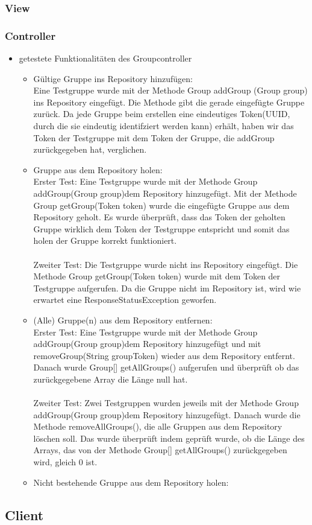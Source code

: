 \documentclass[a4paper]{scrreprt}
\begin{document}
\subsubsection{View}


\subsubsection{Controller}
\begin{itemize}
	\item \b getestete Funktionalitäten des Groupcontroller
	\begin{itemize}
		\item {Gültige Gruppe ins Repository hinzufügen: \\
		Eine Testgruppe wurde mit der Methode Group addGroup (Group group) ins Repository eingefügt. Die Methode gibt die gerade eingefügte Gruppe zurück.
Da jede Gruppe beim erstellen eine eindeutiges Token(UUID, durch die sie eindeutig identifziert werden kann) erhält, haben wir das Token der Testgruppe mit dem Token der Gruppe, die addGroup zurückgegeben hat, verglichen.		
		}
		
		\item {Gruppe aus dem Repository holen: \\
		Erster Test: Eine Testgruppe wurde mit der Methode Group addGroup(Group group)dem Repository hinzugefügt. Mit der Methode Group getGroup(Token token) wurde die eingefügte Gruppe aus dem Repository geholt. Es wurde überprüft, dass das Token der geholten Gruppe wirklich dem Token der Testgruppe entspricht und somit das holen der Gruppe korrekt funktioniert. \\
		\\ Zweiter Test: Die Testgruppe wurde nicht ins Repository eingefügt. Die Methode Group getGroup(Token token) wurde mit dem Token der Testgruppe aufgerufen. Da die Gruppe nicht im Repository ist, wird wie erwartet eine ResponseStatusException geworfen. }
		
		\item {(Alle) Gruppe(n) aus dem Repository entfernen: \\
		Erster Test: Eine Testgruppe wurde mit der Methode Group addGroup(Group group)dem Repository hinzugefügt und mit removeGroup(String groupToken) wieder aus dem Repository entfernt. Danach wurde Group[] getAllGroups() aufgerufen und überprüft ob das zurückgegebene Array die Länge null hat. \\
		\\ Zweiter Test: Zwei Testgruppen wurden jeweils mit der Methode Group addGroup(Group group)dem Repository hinzugefügt. Danach wurde die Methode removeAllGroups(), die alle Gruppen aus dem Repository löschen soll. Das wurde überprüft indem geprüft wurde, ob die Länge des Arrays, das von der Methode Group[] getAllGroups() zurückgegeben wird, gleich 0 ist.
		}
		
		\item {Nicht bestehende Gruppe aus dem Repository holen: \\
		
		}
		
	\end{itemize}
\end{itemize}


\subsection{Client}


\printglossaries
\end{document}

